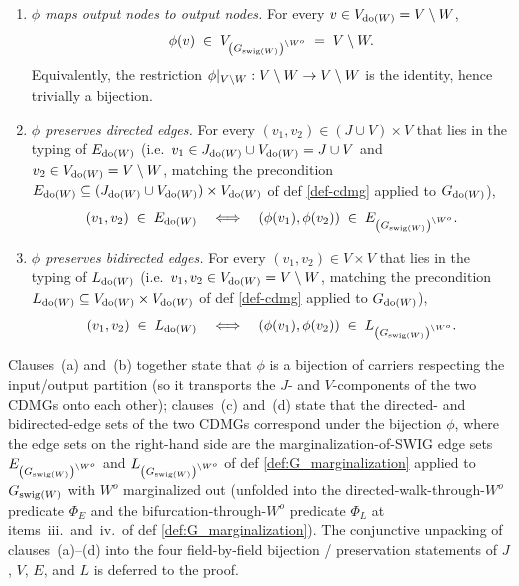 \documentclass[main]{subfiles}
\begin{document}
\begin{Lem}
\begin{enumerate}[label=(\alph*)]
        \item \emph{$\phi$ maps output nodes to output nodes.}
              For every $v \in V_{\operatorname{do}(W)} = V \setminus W$,
              \[
                  \phi(v) \;\in\; V_{\left ( G_{\mathrm{swig}(W)} \right )^{\setminus W^o}} \;=\; V \setminus W.
              \]
              Equivalently, the restriction $\phi\rvert_{V \setminus W} : V \setminus W \to V \setminus W$ is the identity, hence trivially a bijection.

        \item \emph{$\phi$ preserves directed edges.}
              For every $(v_1, v_2) \in (J \cup V) \times V$ that lies in the typing of $E_{\operatorname{do}(W)}$ (i.e.\ $v_1 \in J_{\operatorname{do}(W)} \cup V_{\operatorname{do}(W)} = J \cup V$ and $v_2 \in V_{\operatorname{do}(W)} = V \setminus W$, matching the precondition $E_{\operatorname{do}(W)} \subseteq (J_{\operatorname{do}(W)} \cup V_{\operatorname{do}(W)}) \times V_{\operatorname{do}(W)}$ of def \ref{def-cdmg} applied to $G_{\operatorname{do}(W)}$),
              \[
                  (v_1, v_2) \;\in\; E_{\operatorname{do}(W)}
                  \quad\Longleftrightarrow\quad
                  (\phi(v_1), \phi(v_2)) \;\in\; E_{\left ( G_{\mathrm{swig}(W)} \right )^{\setminus W^o}}.
              \]

        \item \emph{$\phi$ preserves bidirected edges.}
              For every $(v_1, v_2) \in V \times V$ that lies in the typing of $L_{\operatorname{do}(W)}$ (i.e.\ $v_1, v_2 \in V_{\operatorname{do}(W)} = V \setminus W$, matching the precondition $L_{\operatorname{do}(W)} \subseteq V_{\operatorname{do}(W)} \times V_{\operatorname{do}(W)}$ of def \ref{def-cdmg} applied to $G_{\operatorname{do}(W)}$),
              \[
                  (v_1, v_2) \;\in\; L_{\operatorname{do}(W)}
                  \quad\Longleftrightarrow\quad
                  (\phi(v_1), \phi(v_2)) \;\in\; L_{\left ( G_{\mathrm{swig}(W)} \right )^{\setminus W^o}}.
              \]
    \end{enumerate}
    Clauses~(a) and~(b) together state that $\phi$ is a bijection of carriers respecting the input/output partition (so it transports the $J$- and $V$-components of the two CDMGs onto each other); clauses~(c) and~(d) state that the directed- and bidirected-edge sets of the two CDMGs correspond under the bijection $\phi$, where the edge sets on the right-hand side are the marginalization-of-SWIG edge sets $E_{\left ( G_{\mathrm{swig}(W)} \right )^{\setminus W^o}}$ and $L_{\left ( G_{\mathrm{swig}(W)} \right )^{\setminus W^o}}$ of def \ref{def:G_marginalization} applied to $G_{\mathrm{swig}(W)}$ with $W^o$ marginalized out (unfolded into the directed-walk-through-$W^o$ predicate $\Phi_E$ and the bifurcation-through-$W^o$ predicate $\Phi_L$ at items~iii.\ and~iv.\ of def \ref{def:G_marginalization}). The conjunctive unpacking of clauses~(a)--(d) into the four field-by-field bijection / preservation statements of $J$, $V$, $E$, and $L$ is deferred to the proof.
\end{Lem}
\end{document}

